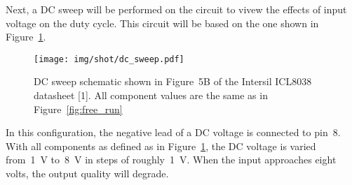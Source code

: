 Next, a DC sweep will be performed on the circuit to vivew the effects of input
voltage on the duty cycle.  This circuit will be based on the one shown in
Figure~\ref{fig:dc_sweep}.
%
\begin{figure}[H]
	\centering
	\texttt{[image: img/shot/dc\_sweep.pdf]}
	\caption{DC sweep schematic shown in Figure~5B of the Intersil ICL8038 datasheet [1].  All component values are the same as in Figure~\ref{fig:free_run}}
	\label{fig:dc_sweep}
\end{figure}
%
In this configuration, the negative lead of a DC voltage is connected to pin~8.
With all components as defined as in Figure~\ref{fig:dc_sweep}, the DC voltage
is varied from~\SI{1}{\volt} to~\SI{8}{\volt} in steps of
roughly~\SI{1}{\volt}.  When the input approaches eight volts, the output
quality will degrade.
